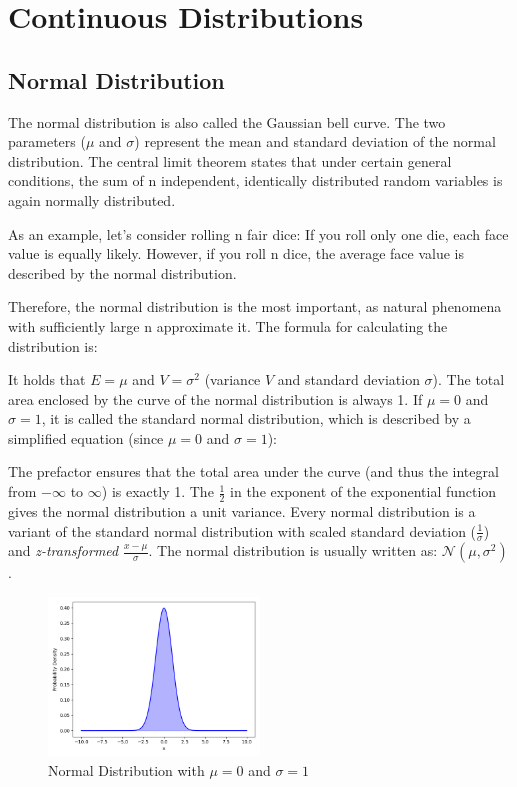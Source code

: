 \section{Continuous Distributions}\label{Continuous Distributions}

\subsection{Normal Distribution}\label{Normal Distribution}
The normal distribution is also called the Gaussian bell curve. The two parameters ($\mu$ and $\sigma$) represent the mean and standard deviation of the normal distribution. The central limit theorem states that under certain general conditions, the sum of n independent, identically distributed random variables is again normally distributed.

As an example, let's consider rolling n fair dice: If you roll only one die, each face value is equally likely. However, if you roll n dice, the average face value is described by the normal distribution.

Therefore, the normal distribution is the most important, as natural phenomena with sufficiently large n approximate it. The formula for calculating the distribution is:

It holds that $E=\mu$ and $V=\sigma^2$ (variance $V$ and standard deviation $\sigma$). The total area enclosed by the curve of the normal distribution is always 1. If $\mu=0$ and $\sigma=1$, it is called the standard normal distribution, which is described by a simplified equation (since $\mu=0$ and $\sigma=1$):

The prefactor ensures that the total area under the curve (and thus the integral from $-\infty$ to $\infty$) is exactly 1. The $\frac{1}{2}$ in the exponent of the exponential function gives the normal distribution a unit variance. Every normal distribution is a variant of the standard normal distribution with scaled standard deviation ($\frac{1}{\sigma}$) and \textit{z-transformed} $\frac{x - \mu}{\sigma}$. The normal distribution is usually written as: $\mathcal{N}(\mu, \sigma^2)$.

\begin{figure}[h]
    \centering
    \includegraphics[width=0.5\textwidth]{../images/plot_normal_distribution.png}
    \caption{Normal Distribution with $\mu=0$ and $\sigma=1$}
    \label{fig:normal_distribution}
\end{figure}


